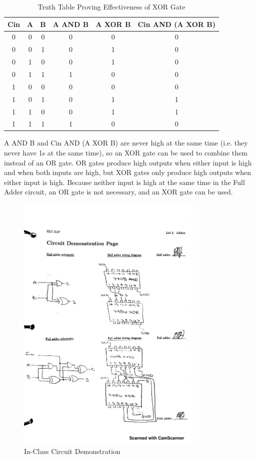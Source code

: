 \documentclass[11pt]{article}
\begin{document}
\begin{table}[ht]\centering
	\caption{Truth Table Proving Effectiveness of XOR Gate}
	\label{tbl:truth_table}
	\begin{tabular}{ccc|ccc}
    	\toprule
    	Cin & A & B & A AND B & A XOR B & Cin AND (A XOR B) \\
    	\midrule
    	0 & 0 & 0 & 0 & 0 & 0 \\
    	0 & 0 & 1 & 0 & 1 & 0 \\
    	0 & 1 & 0 & 0 & 1 & 0 \\
    	0 & 1 & 1 & 1 & 0 & 0 \\
    	1 & 0 & 0 & 0 & 0 & 0 \\
    	1 & 0 & 1 & 0 & 1 & 1 \\
    	1 & 1 & 0 & 0 & 1 & 1 \\
    	1 & 1 & 1 & 1 & 0 & 0 \\
    	\bottomrule
    \end{tabular} 
\end{table}

A AND B and Cin AND (A XOR B) are never high at the same time (i.e. they never have 1s at the same time), so an XOR gate can be used to combine them instead of an OR gate. OR gates produce high outputs when either input is high and when both inputs are high, but XOR gates only produce high outputs when either input is high. Because neither input is high at the same time in the Full Adder circuit, an OR gate is not necessary, and an XOR gate can be used.

\begin{figure}\centering
	\includegraphics[width=0.8\textwidth,trim=0cm 0cm 0cm 0cm,clip]{Lab3_Circuit_Demonstration_Page} 
	\caption{In-Class Circuit Demonstration}
	\label{fig:Circuit_Demonstration}
\end{figure}	
\end{document}
